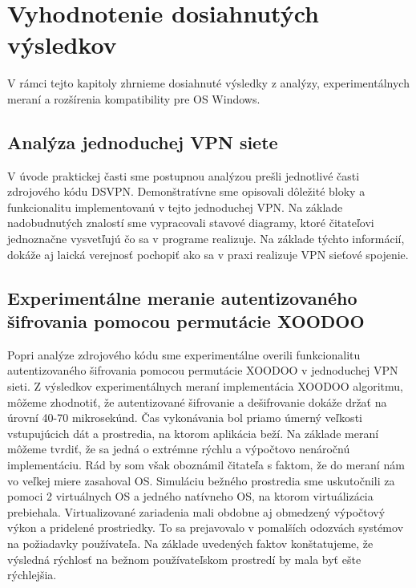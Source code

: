 \chapter{Vyhodnotenie dosiahnutých výsledkov}
V rámci tejto kapitoly zhrnieme dosiahnuté výsledky z analýzy, experimentálnych meraní a rozšírenia kompatibility pre OS Windows.
\section{Analýza jednoduchej VPN siete}
V úvode praktickej časti sme postupnou analýzou prešli jednotlivé časti zdrojového kódu DSVPN. Demonštratívne sme opisovali dôležité bloky a funkcionalitu implementovanú v tejto jednoduchej VPN. Na základe nadobudnutých znalostí sme vypracovali stavové diagramy, ktoré čitateľovi jednoznačne vysvetľujú čo sa v programe realizuje. Na základe týchto informácií, dokáže aj laická verejnosť pochopiť ako sa v praxi realizuje VPN sieťové spojenie.
\section{Experimentálne meranie autentizovaného šifrovania pomocou permutácie XOODOO}
Popri analýze zdrojového kódu sme experimentálne overili funkcionalitu autentizovaného šifrovania pomocou permutácie XOODOO v jednoduchej VPN sieti. Z výsledkov experimentálnych meraní implementácia XOODOO algoritmu, môžeme zhodnotiť, že autentizované šifrovanie a dešifrovanie dokáže držať na úrovní 40-70 mikrosekúnd. Čas vykonávania bol priamo úmerný veľkosti vstupujúcich dát a prostredia, na ktorom aplikácia beží. Na základe meraní môžeme tvrdiť, že sa jedná o extrémne rýchlu a výpočtovo nenáročnú implementáciu. Rád by som však oboznámil čitateľa s faktom, že do meraní nám vo veľkej miere zasahoval OS. Simuláciu bežného prostredia sme uskutočnili za pomoci 2 virtuálnych OS a jedného natívneho OS, na ktorom virtuálizácia prebiehala. Virtualizované zariadenia mali obdobne aj obmedzený výpočtový výkon a pridelené prostriedky. To sa prejavovalo v pomalších odozvách systémov na požiadavky používateľa. Na základe uvedených faktov konštatujeme, že výsledná rýchlosť na bežnom používateľskom prostredí by mala byť ešte rýchlejšia.

